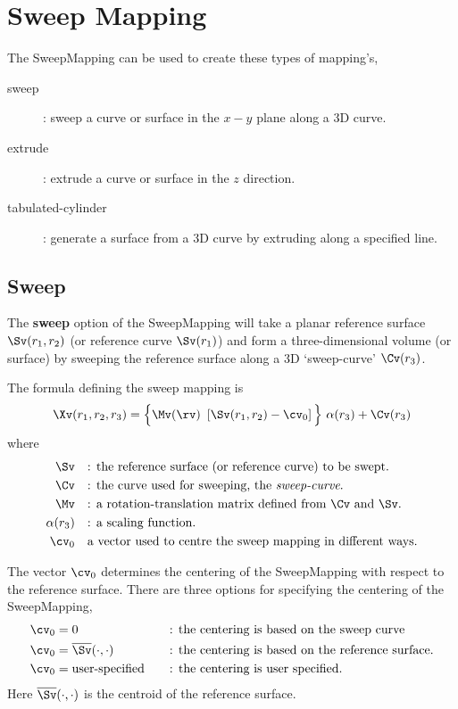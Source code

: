 \section{Sweep Mapping}

The SweepMapping can be used to create these types of mapping's,
\begin{description}
  \item[sweep]: sweep a curve or surface in the $x-y$ plane along a 3D curve.
  \item[extrude]: extrude a curve or surface in the $z$ direction.
  \item[tabulated-cylinder] : generate a surface from a 3D curve by extruding along a specified line.
\end{description}

\subsection{Sweep}

The {\bf sweep} option of the 
SweepMapping will take a planar reference surface $\Sv(r_1,r_2)$ (or reference curve $ \Sv(r_1)$)
and form a three-dimensional volume (or surface) by sweeping the reference surface along a 
3D `sweep-curve' $\Cv(r_3)$. 

The formula defining the sweep mapping is
\begin{displaymath}
\Xv(r_1,r_2,r_3)=\Big\{ \Mv(\rv)~\left[{\Sv}(r_1,r_2) - \cv_0\right]\Big\}~\alpha(r_3)+{\Cv}(r_3)
\end{displaymath}
where 
\begin{align*}
 \Sv & \quad\mbox{: the reference surface (or reference curve) to be swept.}\\
 \Cv & \quad\mbox{: the curve used for sweeping, the {\it sweep-curve}.}\\
 \Mv & \quad\mbox{: a rotation-translation matrix defined from $\Cv$ and $\Sv$.} \\
 \alpha(r_3) & \quad\mbox{: a scaling function.} \\
 \cv_0 & \quad\mbox{a vector used to centre the sweep mapping in different ways.} 
\end{align*}


The vector $\cv_0$ determines the centering of the SweepMapping with respect to the
reference surface.
There are three options for specifying the centering of the SweepMapping,
\begin{alignat*}{3}
 \cv_0 & = 0  && \quad\mbox{: the centering is based on the sweep curve}\\
 \cv_0 & = \overline{\Sv}(\cdot,\cdot)&&   \quad\mbox{: the centering is based on the reference surface.}\\
 \cv_0 & = \mbox{user-specified} && \quad\mbox{: the centering is user specified.}
\end{alignat*}
Here $\overline{\Sv}(\cdot,\cdot)$ is the centroid of the reference surface. 


